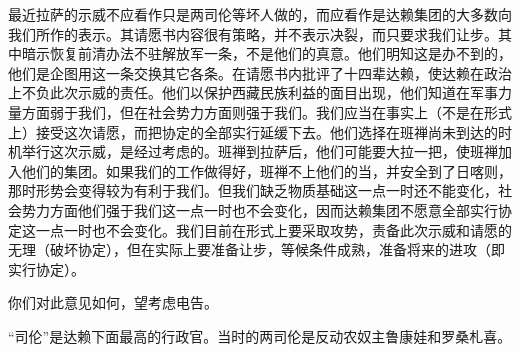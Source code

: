 最近拉萨的示威不应看作只是两司伦等坏人做的，而应看作是达赖集团的大多数向我们所作的表示。其请愿书内容很有策略，并不表示决裂，而只要求我们让步。其中暗示恢复前清办法不驻解放军一条，不是他们的真意。他们明知这是办不到的，他们是企图用这一条交换其它各条。在请愿书内批评了十四辈达赖，使达赖在政治上不负此次示威的责任。他们以保护西藏民族利益的面目出现，他们知道在军事力量方面弱于我们，但在社会势力方面则强于我们。我们应当在事实上（不是在形式上）接受这次请愿，而把协定的全部实行延缓下去。他们选择在班禅尚未到达的时机举行这次示威，是经过考虑的。班禅到拉萨后，他们可能要大拉一把，使班禅加入他们的集团。如果我们的工作做得好，班禅不上他们的当，并安全到了日喀则，那时形势会变得较为有利于我们。但我们缺乏物质基础这一点一时还不能变化，社会势力方面他们强于我们这一点一时也不会变化，因而达赖集团不愿意全部实行协定这一点一时也不会变化。我们目前在形式上要采取攻势，责备此次示威和请愿的无理（破坏协定），但在实际上要准备让步，等候条件成熟，准备将来的进攻（即实行协定）。

你们对此意见如何，望考虑电告。


\begin{maonote}
“司伦”是达赖下面最高的行政官。当时的两司伦是反动农奴主鲁康娃和罗桑札喜。
\end{maonote}
